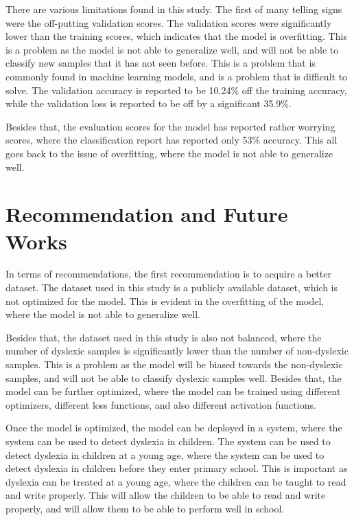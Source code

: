 There are various limitations found in this study. The first of many telling signs were the off-putting validation scores. The validation scores were significantly lower than the training scores, which indicates that the model is overfitting. This is a problem as the model is not able to generalize well, and will not be able to classify new samples that it has not seen before. This is a problem that is commonly found in machine learning models, and is a problem that is difficult to solve. The validation accuracy is reported to be 10.24\% off the training accuracy, while the validation loss is reported to be off by a significant 35.9\%. 

Besides that, the evaluation scores for the model has reported rather worrying scores, where the classification report has reported only 53\% accuracy. This all goes back to the issue of overfitting, where the model is not able to generalize well. 

\section{Recommendation and Future Works}

In terms of recommendations, the first recommendation is to acquire a better dataset. The dataset used in this study is a publicly available dataset, which is not optimized for the model. This is evident in the overfitting of the model, where the model is not able to generalize well. 

Besides that, the dataset used in this study is also not balanced, where the number of dyslexic samples is significantly lower than the number of non-dyslexic samples. This is a problem as the model will be biased towards the non-dyslexic samples, and will not be able to classify dyslexic samples well. Besides that, the model can be further optimized, where the model can be trained using different optimizers, different loss functions, and also different activation functions.

Once the model is optimized, the model can be deployed in a system, where the system can be used to detect dyslexia in children. The system can be used to detect dyslexia in children at a young age, where the system can be used to detect dyslexia in children before they enter primary school. This is important as dyslexia can be treated at a young age, where the children can be taught to read and write properly. This will allow the children to be able to read and write properly, and will allow them to be able to perform well in school.

